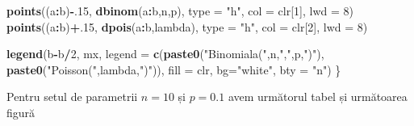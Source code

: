 \documentclass[]{article}
\newenvironment{Shaded}{\begin{snugshade}}{\end{snugshade}}
\newcommand{\KeywordTok}[1]{\textcolor[rgb]{0.13,0.29,0.53}{\textbf{#1}}}
\newcommand{\DataTypeTok}[1]{\textcolor[rgb]{0.13,0.29,0.53}{#1}}
\newcommand{\DecValTok}[1]{\textcolor[rgb]{0.00,0.00,0.81}{#1}}
\newcommand{\StringTok}[1]{\textcolor[rgb]{0.31,0.60,0.02}{#1}}
\newcommand{\OperatorTok}[1]{\textcolor[rgb]{0.81,0.36,0.00}{\textbf{#1}}}
\newcommand{\NormalTok}[1]{#1}
\begin{document}
\begin{Shaded}
\begin{Highlighting}[]
    \KeywordTok{points}\NormalTok{((a}\OperatorTok{:}\NormalTok{b)}\OperatorTok{-}\NormalTok{.}\DecValTok{15}\NormalTok{, }\KeywordTok{dbinom}\NormalTok{(a}\OperatorTok{:}\NormalTok{b,n,p), }\DataTypeTok{type =} \StringTok{"h"}\NormalTok{,}
           \DataTypeTok{col =}\NormalTok{ clr[}\DecValTok{1}\NormalTok{], }\DataTypeTok{lwd =} \DecValTok{8}\NormalTok{)}
    \KeywordTok{points}\NormalTok{((a}\OperatorTok{:}\NormalTok{b)}\OperatorTok{+}\NormalTok{.}\DecValTok{15}\NormalTok{, }\KeywordTok{dpois}\NormalTok{(a}\OperatorTok{:}\NormalTok{b,lambda), }\DataTypeTok{type =} \StringTok{"h"}\NormalTok{,}
           \DataTypeTok{col =}\NormalTok{ clr[}\DecValTok{2}\NormalTok{], }\DataTypeTok{lwd =} \DecValTok{8}\NormalTok{)}
    
    \KeywordTok{legend}\NormalTok{(b}\OperatorTok{-}\NormalTok{b}\OperatorTok{/}\DecValTok{2}\NormalTok{, mx, }\DataTypeTok{legend =} \KeywordTok{c}\NormalTok{(}\KeywordTok{paste0}\NormalTok{(}\StringTok{"Binomiala("}\NormalTok{,n,}\StringTok{","}\NormalTok{,p,}\StringTok{")"}\NormalTok{),}
                               \KeywordTok{paste0}\NormalTok{(}\StringTok{"Poisson("}\NormalTok{,lambda,}\StringTok{")"}\NormalTok{)), }
           \DataTypeTok{fill =}\NormalTok{ clr, }\DataTypeTok{bg=}\StringTok{"white"}\NormalTok{,}
           \DataTypeTok{bty =} \StringTok{"n"}\NormalTok{)}
\NormalTok{\}}
\end{Highlighting}
\end{Shaded}

Pentru setul de parametrii \(n=10\) și \(p=0.1\) avem următorul tabel și
următoarea figură

\end{document}
